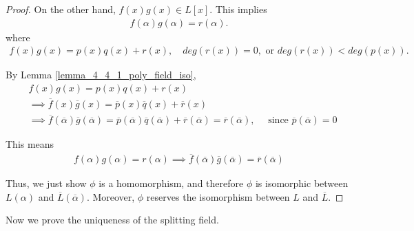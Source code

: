 \documentclass[utf8]{ctexbook}
\begin{document}
\begin{proof}
On the other hand, $f(x) g(x)  \in L[x]$. This implies 
\begin{align*}
f(\alpha) g(\alpha) = r(\alpha) .
\end{align*}
where
\begin{align*}
f(x) g(x) = p(x) q(x) + r(x), \quad deg(r(x)) = 0, \mbox{ or } deg(r(x)) < deg(p(x)) .
\end{align*}

By Lemma \ref{lemma_4_4_1_poly_field_iso}, 
\begin{align*}
& f(x) g(x) = p(x) q(x) + r(x) \\
& \implies \overline{f} (x) \overline{g} (x) = \overline{p} (x) \overline{q} (x) + \overline{r} (x) \\
& \implies \overline{f}(\overline{\alpha}) \overline{g} (\overline{\alpha}) = \overline{p} ( \overline{\alpha} ) \overline{q} (\overline{\alpha}) + \overline{r} ( \overline{\alpha} ) =\overline{r} ( \overline{\alpha} )  , \quad \mbox{ since } \overline{p} (\overline{\alpha} ) = 0
\end{align*}

This means
\begin{align*}
f(\alpha) g(\alpha) = r(\alpha) \implies \overline{f}(\overline{\alpha}) \overline{g} (\overline{\alpha}) = \overline{r} ( \overline{\alpha} )
\end{align*}

Thus, we just show $\phi$ is a homomorphism, and therefore $\phi$ is isomorphic between $L(\alpha) $ and $\overline{L} (\overline{\alpha})$. Moreover, $\phi$ reserves the isomorphism between $L$ and $\overline{L}$.

\end{proof}

Now we prove the uniqueness of the splitting field.
\end{document}
